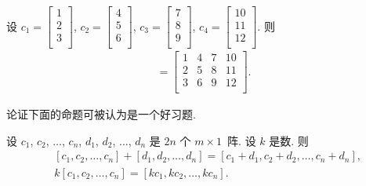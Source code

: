 \begin{example}
    设
    \(c_1 =  \begin{bmatrix}
        1 \\2\\3\\
    \end{bmatrix}\),
    \(c_2 =  \begin{bmatrix}
        4 \\5\\6\\
    \end{bmatrix}\),
    \(c_3 =  \begin{bmatrix}
        7 \\8\\9\\
    \end{bmatrix}\),
    \(c_4 =  \begin{bmatrix}
        10 \\11\\12\\
    \end{bmatrix}\).
    则
    \begin{align*}
        [c_1, c_2, c_3, c_4]
        =
        \begin{bmatrix}
            1 & 4 & 7 & 10 \\
            2 & 5 & 8 & 11 \\
            3 & 6 & 9 & 12 \\
        \end{bmatrix}.
    \end{align*}
\end{example}

论证下面的命题可被认为是一个好习题.

\begin{theorem}
    设
    \(c_1\), \(c_2\), \(\dots\), \(c_n\),
    \(d_1\), \(d_2\), \(\dots\), \(d_n\)
    是 \(2n\) 个 \(m \times 1\)~阵.
    设 \(k\) 是数.
    则
    \begin{align*}
         & [c_1, c_2, \dots, c_n] + [d_1, d_2, \dots, d_n]
        = [c_1 + d_1, c_2 + d_2, \dots, c_n + d_n],        \\
         & k[c_1, c_2, \dots, c_n]
        = [kc_1, kc_2, \dots, kc_n].
    \end{align*}
\end{theorem}

